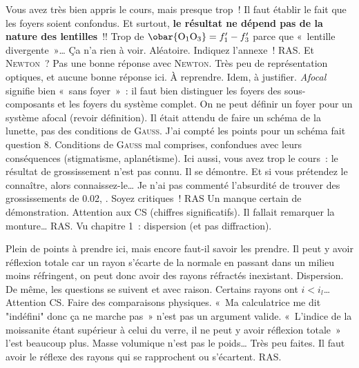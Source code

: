 \documentclass[a4paper, 10pt, final, garamond]{book}
\begin{document}
\begin{enumerate}
   Vous avez très bien appris le cours, mais presque trop~! Il faut
  établir le fait que les foyers soient confondus. Et surtout, \textbf{le
  résultat ne dépend pas de la nature des lentilles}~!! Trop de $\obar{\rm
  O_1O_3} = f_1' - f_3'$ parce que «~lentille divergente~»… Ça n'a rien à voir.
   Aléatoire.
   Indiquez l'annexe~! RAS.
   Et \textsc{Newton}~? Pas une bonne réponse avec \textsc{Newton}.
   Très peu de représentation optiques, et aucune bonne réponse ici. À
  reprendre.
   Idem, à justifier. \textit{Afocal} signifie bien «~sans foyer~»~: il
  faut bien distinguer les foyers des sous-composants et les foyers du système
  complet. On ne peut définir un foyer pour un système afocal (revoir
  définition).
   Il était attendu de faire un schéma de la lunette, pas des
  conditions de \textsc{Gauss}. J'ai compté les points pour un schéma fait
  question 8.
  \smallbreak
  Conditions de \textsc{Gauss} mal comprises, confondues avec leurs conséquences
  (stigmatisme, aplanétisme).
   Ici aussi, vous avez trop le cours~: le résultat de grossissement
  n'est pas connu. Il se démontre. Et si vous prétendez le connaître, alors
  connaissez-le…
  \smallbreak
  Je n'ai pas commenté l'absurdité de trouver des grossissements de \num{0.02},
  . Soyez critiques~!
   RAS
   Un manque certain de démonstration.
   Attention aux CS (chiffres significatifs).
   Il fallait remarquer la monture… RAS.
   Vu chapitre 1~: dispersion (et pas diffraction).
\end{enumerate}

\setcounter{section}{0}
\begin{enumerate}
   Plein de points à prendre ici, mais encore faut-il savoir les
  prendre. Il peut y avoir réflexion totale car un rayon s'écarte de la normale
  en passant dans un milieu moins réfringent, on peut donc avoir des rayons
  réfractés inexistant.
   Dispersion.
   De même, les questions se suivent et avec raison. Certains rayons
  ont $i<i_{l}$…
   Attention CS.
   Faire des comparaisons physiques. «~Ma calculatrice me dit
  "indéfini" donc ça ne marche pas~» n'est pas un argument valide. «~L'indice de
  la moissanite étant supérieur à celui du verre, il ne peut y avoir réflexion
  totale~» l'est beaucoup plus.
   Masse volumique n'est pas le poids…
   Très peu faites. Il faut avoir le réflexe des rayons qui se
  rapprochent ou s'écartent.
   RAS.
\end{enumerate}
\end{document}
